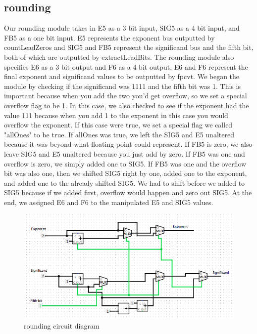 \documentclass{article}
\begin{document}
\subsection*{rounding}
Our rounding module takes in E5 as a 3 bit input, SIG5 as a 4 bit input, and FB5 as a one bit input. E5 represents the exponent bus outputted by countLeadZeros and SIG5 and FB5 represent the significand bus and the fifth bit, both of which are outputted by extractLeadBits. The rounding module also specifies E6 as a 3 bit output and F6 as a 4 bit output. E6 and F6 represent the final exponent and significand values to be outputted by fpcvt. We began the module by checking if the significand was 1111 and the fifth bit was 1. This is important because when you add the two you'd get overflow, so we set a special overflow flag to be 1. In this case, we also checked to see if the exponent had the value 111 because when you add 1 to the exponent in this case you would overflow the exponent. If this case were true, we set a special flag we called "allOnes" to be true. If allOnes was true, we left the SIG5 and E5 unaltered because it was beyond what floating point could represent. If FB5 is zero, we also leave SIG5 and E5 unaltered because you just add by zero. If FB5 was one and overflow is zero, we simply added one to SIG5. If FB5 was one and the overflow bit was also one, then we shifted SIG5 right by one, added one to the exponent, and added one to the already shifted SIG5. We had to shift before we added to SIG5 because if we added first, overflow would happen and zero out SIG5. At the end, we assigned E6 and F6 to the manipulated E5 and SIG5 values.

\begin{figure}[H]
	\begin{center}
		\includegraphics[width=1\textwidth]{RoundingCD.png} 
		\caption{rounding circuit diagram}
	\end{center}
\end{figure}




%

%

\end{document}
